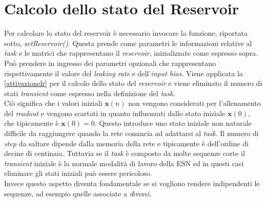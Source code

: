 \section{Calcolo dello stato del Reservoir}
Per calcolare lo stato del reservoir è necessario invocare la funzione, riportata sotto, \textit{setReservoir()}. Questa prende come parametri le informazioni relative al \textit{task} e le matrici che rappresentano il \textit{reservoir}, inizializzate come espresso sopra.
Può prendere in ingresso dei parametri opzionali che rappresentano rispettivamente il valore del \textit{leaking rate} e dell'\textit{input bias}. Viene applicata la \ref{attivazionelr} per il calcolo dello stato del \textit{reservoir} e viene eliminato il numero di stati \textit{transient}  come espresso nella definizione del \textit{task}.\\
Ciò significa che i valori iniziali $\mathbf{x}(n)$ non vengono considerati per l'allenamento del \textit{readout} e vengono scartati in quanto influenzati dallo stato iniziale $\mathbf{x}(0)$, che tipicamente è $\mathbf{x}(0)=0$. Questo introduce uno stato iniziale non naturale difficile da raggiungere quando la rete comincia ad adattarsi al \textit{task}. Il numero di \textit{step} da saltare dipende dalla memoria della rete e tipicamente è dell'ordine di decine di centinaia. Tuttavia se il \textit{task} è composto da molte sequenze corte il \textit{transient} iniziale è la normale modalità di lavoro della ESN ed in questi casi eliminare gli stati iniziali può essere pericoloso.\\
Invece questo aspetto diventa fondamentale se si vogliono rendere indipendenti le sequenze, ad esempio quelle associate a \textit diversi.



